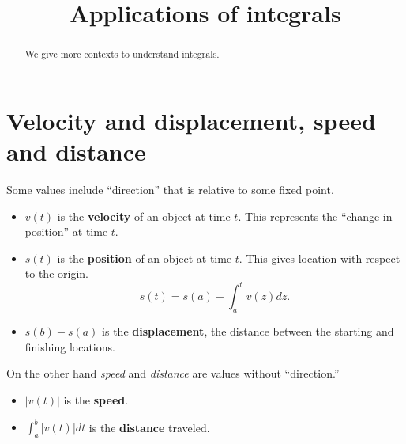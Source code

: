 \documentclass{ximera}
\title[Dig-In:]{Applications of integrals}
\begin{document}
\begin{abstract}
We give more contexts to understand integrals.
\end{abstract}
\maketitle



\section{Velocity and displacement, speed and distance}

Some values include ``direction'' that is relative to some fixed point.


  \begin{itemize}
  \item $v(t)$ is the \textbf{velocity} of an object at time $t$. This
    represents the ``change in position'' at time $t$.
  \item $s(t)$ is the \textbf{position} of an object at time $t$. This
    gives location with respect to the origin.     \[
    s(t) = s(a)+\int_a^t v(z) dz.
    \]
  \item $s(b) -s(a)$ is the \textbf{displacement}, the distance between the
    starting and finishing locations.
  \end{itemize}


On the other hand \textit{speed} and \textit{distance} are values
without ``direction.''


  \begin{itemize}
  \item $|v(t)|$ is the \textbf{speed}.
  \item $\int_a^b |v(t)| dt$ is the \textbf{distance} traveled.
  \end{itemize}
\end{document}
